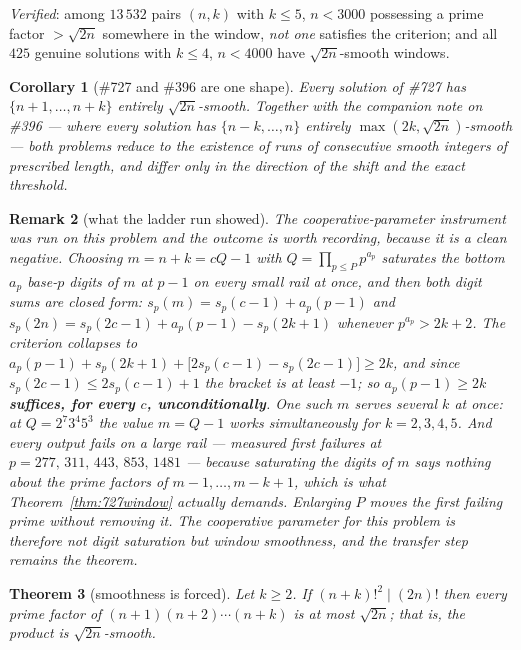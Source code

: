 \documentclass[11pt]{article}
\newtheorem{theorem}{Theorem}
\newtheorem{corollary}[theorem]{Corollary}
\newtheorem{remark}[theorem]{Remark}
\begin{document}
\emph{Verified}: among $13\,532$ pairs $(n,k)$ with $k\le5$, $n<3000$ possessing a prime
factor $>\sqrt{2n}$ somewhere in the window, \emph{not one} satisfies the criterion; and all
$425$ genuine solutions with $k\le4$, $n<4000$ have $\sqrt{2n}$-smooth windows.

\begin{corollary}[\#727 and \#396 are one shape]\label{cor:727is396}
Every solution of \textup{\#727} has $\{n+1,\dots,n+k\}$ entirely $\sqrt{2n}$-smooth.  Together
with the companion note on \textup{\#396} --- where every solution has
$\{n-k,\dots,n\}$ entirely $\max(2k,\sqrt{2n})$-smooth --- both problems reduce to the
existence of runs of consecutive smooth integers of prescribed length, and differ only in the
direction of the shift and the exact threshold.
\end{corollary}

\begin{remark}[what the ladder run showed]\label{rem:ladder}
The cooperative-parameter instrument was run on this problem and the outcome is worth
recording, because it is a clean negative.  Choosing $m=n+k=cQ-1$ with
$Q=\prod_{p\le P}p^{a_p}$ saturates the bottom $a_p$ base-$p$ digits of $m$ at $p-1$ on every
small rail at once, and then both digit sums are closed form:
$s_p(m)=s_p(c-1)+a_p(p-1)$ and $s_p(2n)=s_p(2c-1)+a_p(p-1)-s_p(2k+1)$ whenever
$p^{a_p}>2k+2$.  The criterion collapses to
$a_p(p-1)+s_p(2k+1)+\bigl[2s_p(c-1)-s_p(2c-1)\bigr]\ge 2k$, and since
$s_p(2c-1)\le 2s_p(c-1)+1$ the bracket is at least $-1$; so \textbf{$a_p(p-1)\ge2k$ suffices,
for every $c$, unconditionally}.  One such $m$ serves several $k$ at once: at
$Q=2^7 3^4 5^3$ the value $m=Q-1$ works simultaneously for $k=2,3,4,5$.
\emph{And every output fails on a large rail} --- measured first failures at
$p=277,\,311,\,443,\,853,\,1481$ --- because saturating the digits of $m$ says nothing about
the prime factors of $m-1,\dots,m-k+1$, which is what Theorem~\ref{thm:727window} actually
demands.  Enlarging $P$ moves the first failing prime without removing it.  The cooperative
parameter for this problem is therefore not digit saturation but window smoothness, and the
transfer step remains the theorem.
\end{remark}

\begin{theorem}[smoothness is forced]\label{thm:smooth}
Let $k\ge2$.  If $(n+k)!^2\mid(2n)!$ then every prime factor of
$(n{+}1)(n{+}2)\cdots(n{+}k)$ is at most $\sqrt{2n}$; that is, the product is
$\sqrt{2n}$-smooth.
\end{theorem}
\end{document}
